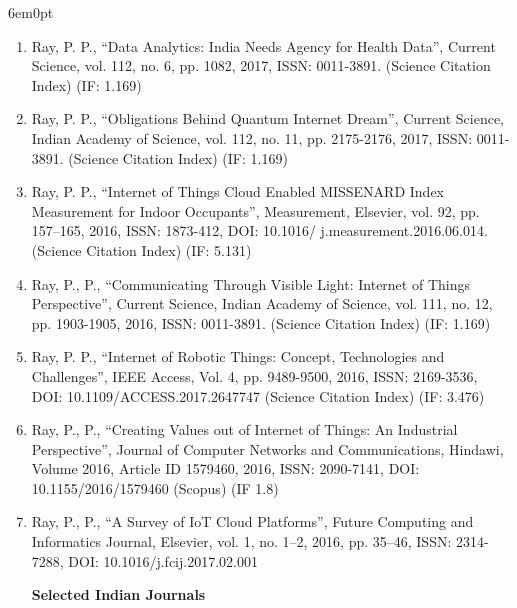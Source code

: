 \documentclass[11pt,a4paper]{moderncv}
\begin{document}
\begin{adjustwidth}{6em}{0pt}
\begin{enumerate}
		\item Ray, P. P., “Data Analytics: India Needs Agency for Health Data”, Current Science, vol. 112, no. 6, pp. 1082, 2017, ISSN: 0011-3891. (Science Citation Index) (IF: 1.169)
		
		\item Ray, P. P., “Obligations Behind Quantum Internet Dream”, Current Science, Indian Academy of Science, vol. 112, no. 11, pp. 2175-2176, 2017, ISSN: 0011-3891. (Science Citation Index) (IF: 1.169)
		
		\item Ray, P. P., “Internet of Things Cloud Enabled MISSENARD Index Measurement for Indoor Occupants”, Measurement, Elsevier, vol. 92, pp. 157–165, 2016, ISSN: 1873-412, DOI: 10.1016/ j.measurement.2016.06.014. (Science Citation Index) (IF: 5.131)
		
		\item Ray, P., P., “Communicating Through Visible Light: Internet of Things Perspective”, Current Science, Indian Academy of Science, vol. 111, no. 12, pp. 1903-1905, 2016, ISSN: 0011-3891. (Science Citation Index) (IF: 1.169)
		
		\item Ray, P. P., “Internet of Robotic Things: Concept, Technologies and Challenges”, IEEE Access, Vol. 4, pp. 9489-9500, 2016, ISSN: 2169-3536, DOI: 10.1109/ACCESS.2017.2647747 (Science Citation Index) (IF: 3.476)
		
		\item Ray, P., P., “Creating Values out of Internet of Things: An Industrial Perspective”, Journal of Computer Networks and Communications, Hindawi, Volume 2016, Article ID 1579460, 2016, ISSN: 2090-7141, DOI: 10.1155/2016/1579460 (Scopus) (IF 1.8)
		
		\item Ray, P., P., “A Survey of IoT Cloud Platforms”, Future Computing and Informatics Journal, Elsevier, vol. 1, no. 1–2, 2016, pp. 35–46, ISSN: 2314-7288, DOI: 10.1016/j.fcij.2017.02.001
		
		
		
		
		
		
		
		
		
		
		
		
		
		
		
		\vspace{0.5cm}
		
		\textbf{Selected Indian Journals}
		

\end{enumerate}
\end{adjustwidth}
\end{document}
